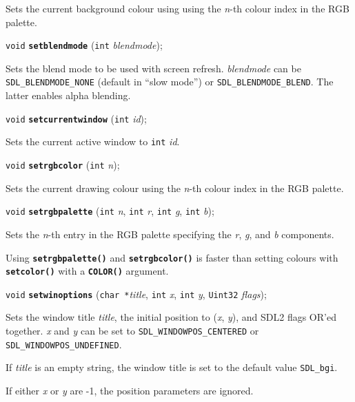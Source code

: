 \documentclass[a4paper,11pt]{article}
\newcommand{\V}{\texttt{void}}      %
\newcommand{\I}{\texttt{int}}       %
\newcommand{\Ut}{\texttt{Uint32}}   %
\newcommand{\C}{\texttt{char *}}    %
\newcommand{\func}[1]{\textbf{\texttt{#1}}}  %
\newcommand{\A}[1]{\emph{#1}}       %
\newcommand{\T}[1]{\texttt{#1}}     %
\newenvironment{bgi}
{ %
  \begin{snugshade}
}
{ %
  \end{snugshade}
}
\begin{document}
Sets the current background colour using using the \A{n}-th colour
index in the RGB palette.


\begin{bgi}
\V{} \func{setblendmode} (\I{} \A{blendmode}); 
\end{bgi}

Sets the blend mode to be used with screen refresh. \A{blendmode} can
be \T{SDL\_BLENDMODE\_NONE} (default in ``slow mode'') or
\T{SDL\_BLENDMODE\_BLEND}. The latter enables alpha blending.


\begin{bgi}
\V{} \func{setcurrentwindow} (\I{} \A{id}); 
\end{bgi}

Sets the current active window to \I{} \A{id}.


\begin{bgi}
\V{} \func{setrgbcolor} (\I{} \A{n}); 
\end{bgi}

Sets the current drawing colour using the \A{n}-th colour index in the
RGB palette.


\begin{bgi}
\V{} \func{setrgbpalette} (\I{} \A{n}, \I{} \A{r}, \I{} \A{g}, \I{} \A{b}); 
\end{bgi}

Sets the \A{n}-th entry in the RGB palette specifying the \A{r},
\A{g}, and \A{b} components.

Using \func{setrgbpalette()} and \func{setrgbcolor()} is faster than
setting colours with \func{setco\-lor()} with a \func{COLOR()}
argument.


\begin{bgi}
\V{} \func{setwinoptions} (\C{}\A{title}, \I{} \A{x}, \I{} \A{y}, 
  \Ut{} \A{flags});
\end{bgi}

Sets the window title \A{title}, the initial position to (\A{x},
\A{y}), and SDL2 flags OR'ed together. \A{x} and \A{y} can be set to
\T{SDL\_WINDOWPOS\_CENTERED} or \T{SDL\_WINDOWPOS\_UNDEFINED}.

If \A{title} is an empty string, the window title is set to the
default value \T{SDL\_bgi}.

If either \A{x} or \A{y} are -1, the position parameters are ignored.
\end{document}
